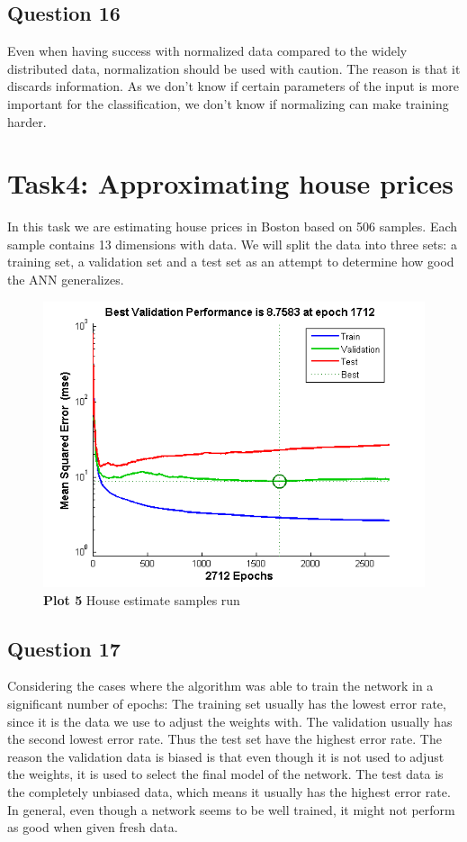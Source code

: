 \documentclass[a4paper]{article}
\begin{document}
\subsection*{Question 16}
Even when having success with normalized data compared to the widely distributed 
data, normalization should be used with caution. The reason is that it discards 
information. As we don't know if certain parameters of the input is more important 
for the classification, we don't know if normalizing can make training harder. 

\section{Task4: Approximating house prices}
In this task we are estimating house prices in Boston based on 506 samples. Each sample contains 13 dimensions with data.
We will split the data into three sets: a training set, a validation set and a test set as an attempt to determine how good the ANN generalizes.

\begin{figure}[h!] %
	\includegraphics[]{housetraining.png}
	\caption{\label{fig:housetraining}\textbf{Plot 5} House estimate samples run}
\end{figure}

\subsection*{Question 17}
Considering the cases where the algorithm was able to train the network in a significant number of epochs: 
The training set usually has the lowest error rate, since it is the data we use to adjust the weights with. The validation usually has the second lowest error rate. Thus the test set have the highest error rate. The reason the validation data is biased is that even though it is not used to adjust the weights, it is used to select the final model of the network. The test data is the completely unbiased data, which means it usually has the highest error rate. 
In general, even though a network seems to be well trained, it might not perform as good when given fresh data.
\end{document}
